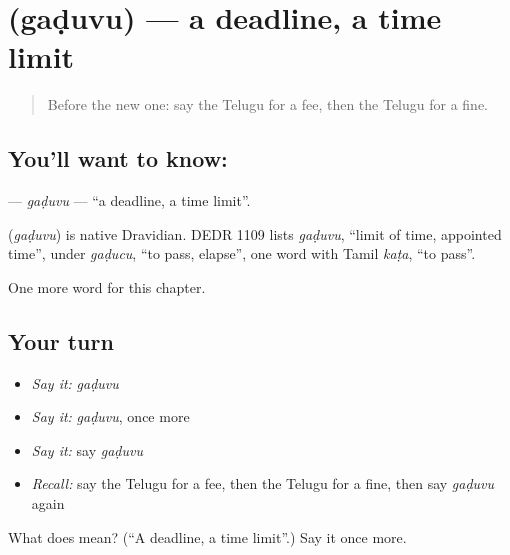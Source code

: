\section[\texorpdfstring{\te{గడువు} (gaḍuvu)}{గడువు (gaḍuvu)}]{ (gaḍuvu) — a deadline, a time limit}

\label{lesson:TE-C196-gaduvu}



\begin{quote}
Before the new one: say the Telugu for a fee, then the Telugu for a fine.
\end{quote}

\subsection*{You'll want to know: }
\textbf{} — \emph{gaḍuvu} — \textquotedblleft{}a deadline, a time limit\textquotedblright{}.

\begin{cousinweb}
\textbf{} (\emph{gaḍuvu}) is native Dravidian. DEDR 1109 lists \emph{gaḍuvu}, \textquotedblleft{}limit of time, appointed time\textquotedblright{}, under \emph{gaḍucu}, \textquotedblleft{}to pass, elapse\textquotedblright{}, one word with Tamil \emph{kaṭa}, \textquotedblleft{}to pass\textquotedblright{}.
\end{cousinweb}

\begin{grammarlens}[title={What you've built}]
One more word for this chapter.
\end{grammarlens}

\subsection*{Your turn}
\begin{itemize}
\raggedright
  \item \emph{Say it:} \emph{gaḍuvu}
  \item \emph{Say it:} \emph{gaḍuvu}, once more
  \item \emph{Say it:} say \emph{gaḍuvu}
  \item \emph{Recall:} say the Telugu for a fee, then the Telugu for a fine, then say \emph{gaḍuvu} again
\end{itemize}

\begin{tcolorbox}[breakable,colback=teal!4,colframe=teal!35!black,title={Before you move on}]
What does  mean? (\textquotedblleft{}A deadline, a time limit\textquotedblright{}.) Say it once more.
\end{tcolorbox}
